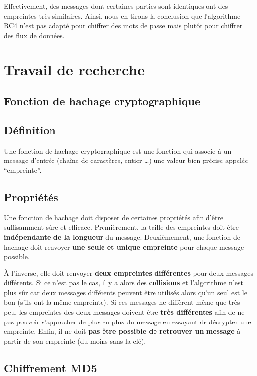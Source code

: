 \documentclass[12pt, a4paper]{article}
\begin{document}
\noindent Effectivement, des messages dont certaines parties sont identiques ont des empreintes très similaires.
Ainsi, nous en tirons la conclusion que l'algorithme RC4 n'est pas adapté pour chiffrer des mots de passe
mais plutôt pour chiffrer des flux de données.

\section{Travail de recherche}

\subsection{Fonction de hachage cryptographique}

\subsection*{Définition}
Une fonction de hachage cryptographique est une fonction qui associe à un message d'entrée
(chaîne de caractères, entier …) une valeur bien précise appelée “empreinte”.

\subsection*{Propriétés}\label{hash_properties}

Une fonction de hachage doit disposer de certaines propriétés afin d'être suffisamment sûre et efficace.
Premièrement, la taille des empreintes doit être \textbf{indépendante de la longueur} du message.
Deuxièmement, une fonction de hachage doit renvoyer \textbf{une seule et unique empreinte} pour chaque message possible.

À l'inverse, elle doit renvoyer \textbf{deux empreintes différentes} pour deux messages différents.
Si ce n'est pas le cas, il y a alors des \textbf{collisions} et l'algorithme n'est plus sûr
car deux messages différents peuvent être utilisés alors qu'un seul est le bon (s'ils ont la même empreinte).
Si ces messages ne diffèrent même que très peu, les empreintes des deux messages doivent être \textbf{très différentes}
 afin de ne pas pouvoir s'approcher de plus en plus du message en essayant de décrypter une empreinte.
Enfin, il ne doit \textbf{pas être possible de retrouver un message} à partir de son empreinte (du moins sans la clé).

\subsection{Chiffrement MD5}
\end{document}
